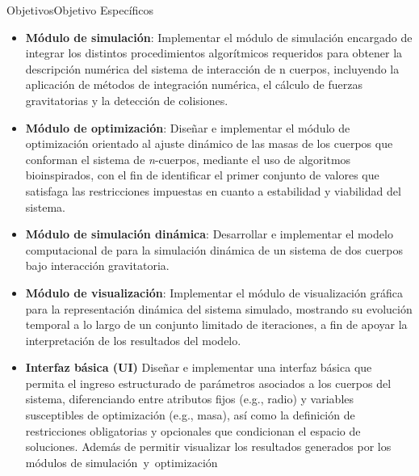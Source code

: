 \begin{frame}[allowframebreaks]{Objetivos}{Objetivo Específicos}%
    \begin{itemize}
        \justifying%
        \item \textbf{\fontsize{10pt}{12pt}\selectfont Módulo de simulación}: {\fontsize{8pt}{10pt}\selectfont Implementar el módulo de simulación encargado de integrar los distintos procedimientos algorítmicos requeridos para obtener la descripción numérica del sistema de interacción de n cuerpos, incluyendo la aplicación de métodos de integración numérica, el cálculo de fuerzas gravitatorias y la detección de colisiones.}
        \item \textbf{\fontsize{10pt}{12pt}\selectfont Módulo de optimización}: {\fontsize{8pt}{10pt}\selectfont
        Diseñar e implementar el módulo de optimización orientado al ajuste dinámico de las masas de los cuerpos que conforman el sistema de \textit{n}-cuerpos, mediante el uso de algoritmos bioinspirados, con el fin de identificar el primer conjunto de valores que satisfaga las restricciones impuestas en cuanto a estabilidad y viabilidad del sistema.
        }
        \item \textbf{\fontsize{10pt}{12pt}\selectfont Módulo de simulación dinámica}: {\fontsize{8pt}{10pt}\selectfont
        Desarrollar e implementar el modelo computacional de para la simulación dinámica de un sistema de dos cuerpos bajo interacción gravitatoria.
        }
        \item \textbf{\fontsize{10pt}{12pt}\selectfont Módulo de visualización}: {\fontsize{8pt}{10pt}\selectfont
        Implementar el módulo de visualización gráfica para la representación dinámica del sistema simulado, mostrando su evolución temporal a lo largo de un conjunto limitado de iteraciones, a fin de apoyar la interpretación de los resultados del modelo.
        }
        \item \textbf{\fontsize{10pt}{12pt}\selectfont Interfaz básica (UI)}{\fontsize{8pt}{10pt}\selectfont
        Diseñar e implementar una interfaz básica que permita el ingreso estructurado de parámetros asociados a los cuerpos del sistema, diferenciando entre atributos fijos (e.g., radio) y variables susceptibles de optimización (e.g., masa), así como la definición de restricciones obligatorias y opcionales que condicionan el espacio de soluciones. Además de permitir visualizar los resultados generados por los módulos de simulación y optimización
        }
    \end{itemize}
\end{frame}

